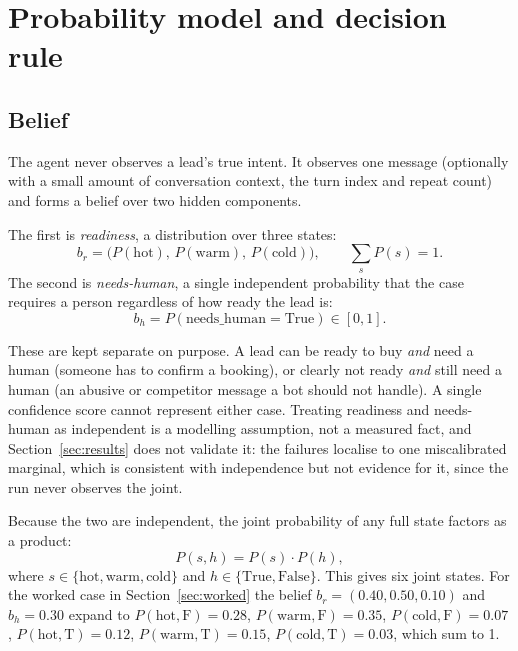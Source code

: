 \documentclass{article}
\begin{document}
\section{Probability model and decision rule}
\label{sec:model}

\subsection{Belief}
The agent never observes a lead's true intent. It observes one message
(optionally with a small amount of conversation context, the turn index and
repeat count) and forms a belief over two hidden components.

The first is \emph{readiness}, a distribution over three states:
\begin{equation}
b_r = \big(P(\text{hot}),\, P(\text{warm}),\, P(\text{cold})\big),
\qquad \sum_{s} P(s) = 1 .
\end{equation}
The second is \emph{needs-human}, a single independent probability that the
case requires a person regardless of how ready the lead is:
\begin{equation}
b_h = P(\text{needs\_human} = \text{True}) \in [0, 1].
\end{equation}

These are kept separate on purpose. A lead can be ready to buy \emph{and} need
a human (someone has to confirm a booking), or clearly not ready \emph{and}
still need a human (an abusive or competitor message a bot should not handle).
A single confidence score cannot represent either case. Treating readiness and
needs-human as independent is a modelling assumption, not a measured fact, and
Section~\ref{sec:results} does not validate it: the failures localise to one
miscalibrated marginal, which is consistent with independence but not evidence for
it, since the run never observes the joint.

Because the two are independent, the joint probability of any full state
factors as a product:
\begin{equation}
P(s, h) = P(s) \cdot P(h),
\end{equation}
where $s \in \{\text{hot}, \text{warm}, \text{cold}\}$ and
$h \in \{\text{True}, \text{False}\}$.
This gives six joint states. For the worked case in
Section~\ref{sec:worked} the belief $b_r = (0.40, 0.50, 0.10)$ and
$b_h = 0.30$ expand to $P(\text{hot},\text{F}) = 0.28$,
$P(\text{warm},\text{F}) = 0.35$, $P(\text{cold},\text{F}) = 0.07$,
$P(\text{hot},\text{T}) = 0.12$, $P(\text{warm},\text{T}) = 0.15$,
$P(\text{cold},\text{T}) = 0.03$, which sum to 1.
\end{document}
